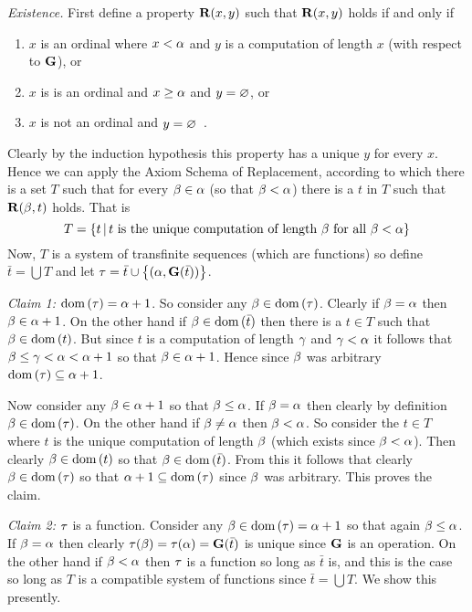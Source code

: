 \begin{questions}
{{    \emph{Existence.} First define a property $\mathbf{R}(x,y)$ such that $\mathbf{R}(x,y)$ holds if and only if
    \begin{enumerate}
    \item $x$ is an ordinal where $x < \alpha$ and $y$ is a computation of length $x$ (with respect to $\mathbf{G}$), or
    \item $x$ is is an ordinal and $x \geq \alpha$ and $y = \varnothing$, or
    \item $x$ is not an ordinal and $y = \varnothing$ \,.
    \end{enumerate}
    Clearly by the induction hypothesis this property has a unique $y$ for every $x$.
    Hence we can apply the Axiom Schema of Replacement, according to which there is a set $T$ such that for every $\beta \in \alpha$ (so that $\beta < \alpha$) there is a $t$ in $T$ such that $\mathbf{R}(\beta, t)$ holds.
    That is
    $$
    T = \left\{ t \,|\, t \text{ is the unique computation of length $\beta$ for all $\beta < \alpha$} \right\}
    $$
    Now, $T$ is a system of transfinite sequences (which are functions) so define $\bar{t} = \bigcup T$ and let $\tau = \bar{t} \cup \left\{ (\alpha, \mathbf{G}(\bar{t})) \right\}$.

    \emph{Claim 1:} $\mathrm{dom}\,(\tau) = \alpha+1$.
    So consider any $\beta \in \mathrm{dom}\,(\tau)$.
    Clearly if $\beta = \alpha$ then $\beta \in \alpha+1$.
    On the other hand if $\beta \in \mathrm{dom}\,(\bar{t})$ then there is a $t \in T$ such that $\beta \in \mathrm{dom}\,(t)$.
    But since $t$ is a computation of length $\gamma$ and $\gamma < \alpha$ it follows that $\beta \leq \gamma < \alpha < \alpha+1$ so that $\beta \in \alpha+1$.
    Hence since $\beta$ was arbitrary $\mathrm{dom}\,(\tau) \subseteq \alpha+1$.

    Now consider any $\beta \in \alpha+1$ so that $\beta \leq \alpha$.
    If $\beta = \alpha$ then clearly by definition $\beta \in \mathrm{dom}\,(\tau)$.
    On the other hand if $\beta \neq \alpha$ then $\beta < \alpha$.
    So consider the $t \in T$ where $t$ is the unique computation of length $\beta$ (which exists since $\beta < \alpha$).
    Then clearly $\beta \in \mathrm{dom}\,(t)$ so that $\beta \in \mathrm{dom}\,(\bar{t})$.
    From this it follows that clearly $\beta \in \mathrm{dom}\,(\tau)$ so that $\alpha+1 \subseteq \mathrm{dom}\,(\tau)$ since $\beta$ was arbitrary.
    This proves the claim.
    
    \emph{Claim 2:} $\tau$ is a function.
    Consider any $\beta \in \mathrm{dom}\,(\tau) = \alpha+1$ so that again $\beta \leq \alpha$.
    If $\beta = \alpha$ then clearly $\tau(\beta) = \tau(\alpha) = \mathbf{G}(\bar{t})$ is unique since $\mathbf{G}$ is an operation.
    On the other hand if $\beta < \alpha$ then $\tau$ is a function so long as $\bar{t}$ is, and this is the case so long as $T$ is a compatible system of functions since $\bar{t} = \bigcup T$.
    We show this presently.

}}
\end{questions}
